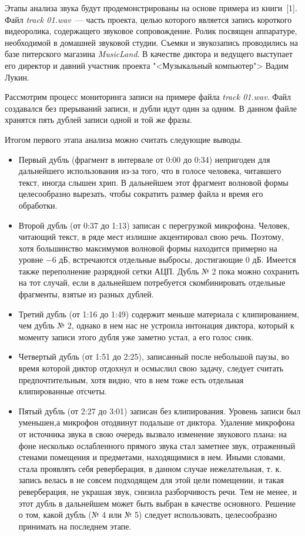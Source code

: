\documentclass[oneside, final, 14pt]{extreport}
\begin{document}
Этапы анализа звука будут продемонстрированы на основе примера из книги~[1]. Файл \textit{track 01.wav}~--- часть проекта, целью которого является запись короткого видеоролика, содержащего звуковое сопровождение. Ролик посвящен аппаратуре, необходимой в домашней звуковой студии. Съемки и звукозапись проводились на базе питерского магазина \textit{MusicLand}. В качестве диктора и ведущего выступает его директор и давний участник проекта "<Музыкальный компьютер"> Вадим Лукин.

Рассмотрим процесс мониторинга записи на примере файла \textit{track 01.wav}. Файл создавался без прерываний записи, и дубли идут один за одним. В данном файле хранятся пять дублей записи одной и той же фразы. 

Итогом первого этапа анализа можно считать следующие выводы.
\begin{itemize}
\item Первый дубль (фрагмент в интервале от 0:00 до 0:34) непригоден для дальнейшего использования из-за того, что в голосе человека, читавшего текст, иногда слышен хрип. В дальнейшем этот фрагмент волновой формы целесообразно вырезать, чтобы сократить размер файла и время его обработки.
\item Второй дубль (от 0:37 до 1:13) записан с перегрузкой микрофона. Человек, читающий текст, в ряде мест излишне акцентировал свою речь. Поэтому, хотя большинство максимумов волновой формы находится примерно на уровне $-6$ дБ, встречаются отдельные выбросы, достигающие $0$ дБ. Имеется также переполнение разрядной сетки АЦП. Дубль № 2 пока можно сохранить на тот случай, если в дальнейшем потребуется скомбинировать отдельные фрагменты, взятые из разных дублей.
\item Третий дубль (от 1:16 до 1:49) содержит меньше материала с клипированием, чем дубль № 2, однако в нем нас не устроила интонация диктора, который к моменту записи этого дубля уже заметно устал, а его голос сник.
\item Четвертый дубль (от 1:51 до 2:25), записанный после небольшой паузы, во время которой диктор отдохнул и осмыслил свою задачу, следует считать  предпочтительным,  хотя  видно,  что  в  нем тоже  есть  отдельная клипированные отсчеты. 
\item Пятый дубль (от 2:27 до 3:01) записан без клипирования. Уровень записи был уменьшен,а микрофон отодвинут подальше от диктора. Удаление микрофона от источника звука в свою очередь вызвало изменение звукового плана: на фоне несколько ослабленного прямого звука стал заметнее звук, отраженный стенами помещения и предметами, находящимися в нем. Иными словами, стала проявлять себя реверберация, в данном случае нежелательная, т. к. запись велась в не совсем подходящем для этой цели помещении, и такая реверберация, не украшая звук, снизила разборчивость речи. Тем не менее, и этот дубль в дальнейшем может быть выбран в качестве основного. Решение о том, какой дубль (№ 4 или № 5) следует использовать, целесообразно принимать на последнем этапе.
\end{itemize}
\end{document}
